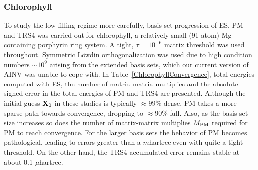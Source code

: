 \commentoutA{\documentclass[prl,aps,twocolumn,showpacs,twocolumngrid,superbib]{revtex4}}
\begin{document}
\subsubsection{Chlorophyll}
 
To study the low filling regime more carefully, basis set progression of ES, PM 
and TRS4 was carried out for chlorophyll, a relatively small (91 atom) Mg containing porphyrin ring system. 
A tight,  $\tau=10^{-6}$ matrix threshold was used throughout.  Symmetric L\"owdin orthogonalization 
was used due to high condition numbers $\sim 10^9$ arising from the extended basis sets, which 
our current version of AINV was unable to cope with.  In Table~\ref{ChlorophyllConvergence}, 
total energies computed with ES, the number of matrix-matrix multiplies and the absolute signed 
error in the total energies of PM and TRS4 are presented.  Although the initial guess ${\bf X}_0$ 
in these studies is typically $\approx 99\%$ dense, PM takes a more sparse path towards convergence, 
dropping to $\approx 90\%$ full.  Also, as the basis set size increases so does the number 
of matrix-matrix multiplies $M_{\rm PM}$ required for PM to reach convergence. For the 
larger basis sets the behavior of PM becomes pathological,  leading to errors greater 
than a $m$hartree even with quite a tight threshold.  On the other hand, the TRS4 accumulated error 
remains stable at about 0.1 $\mu$hartree.
\end{document}
